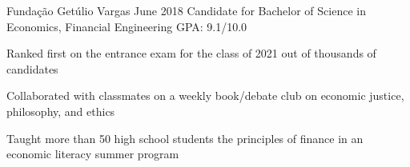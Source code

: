 \begin{exclude}
    \begin{education_xp}
                   {Fundação Getúlio Vargas}
                   {June 2018}
                   {Candidate for Bachelor of Science in Economics, Financial Engineering}
                   {GPA: 9.1/10.0}
    \begin{highlights}
        \item Ranked first on the entrance exam for the class of 2021 out of thousands of candidates
        \item Collaborated with classmates on a weekly book/debate club on economic justice, philosophy, and ethics
        \item Taught more than 50 high school students the principles of finance in an economic literacy summer program
    \end{highlights}
    \end{education_xp}
\end{exclude}